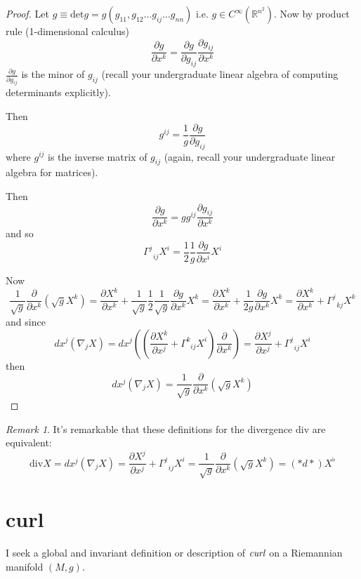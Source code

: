 \documentclass[twoside,landscape,10pt]{amsart}
\theoremstyle{plain}
\theoremstyle{definition}
\theoremstyle{remark}
\theoremstyle{remark}
\newtheorem{remark}{Remark}
\begin{document}
\begin{multicols*}{2}
\begin{proof}
Let $g\equiv \text{det}g = g(g_{11}, g_{12} \dots g_{ij} \dots g_{nn})$ i.e. $g\in C^{\infty}(\mathbb{R}^{n^2})$.  Now by product rule (1-dimensional calculus)
\[
\frac{ \partial g}{ \partial x^k} = \frac{ \partial g}{ \partial g_{ij} } \frac{ \partial g_{ij}}{ \partial x^k}
\]
$\frac{ \partial g}{ \partial g_{ij}}$ is the minor of $g_{ij}$ (recall your undergraduate linear algebra of computing determinants explicitly).  

Then
\[
g^{ij} = \frac{1}{g} \frac{ \partial g}{ \partial g_{ij}}
\]
where $g^{ij}$ is the inverse matrix of $g_{ij}$ (again, recall your undergraduate linear algebra for matrices).  

Then
\[
\frac{ \partial g}{ \partial x^k} = gg^{ij} \frac{ \partial g_{ij}}{ \partial x^k}
\]
and so 
\[
\Gamma^j_{ \; \; ij} X^i = \frac{1}{2} \frac{1}{g} \frac{ \partial g}{ \partial x^i} X^i
\]

Now 
\[
\frac{1}{\sqrt{g}} \frac{ \partial }{ \partial x^k} (\sqrt{g} X^k)  = \frac{ \partial X^k}{ \partial x^k} + \frac{1}{\sqrt{g}} \frac{1}{2} \frac{1}{\sqrt{g}} \frac{ \partial g}{ \partial x^k} X^k = \frac{ \partial X^k}{ \partial x^k} + \frac{1}{2g} \frac{ \partial g}{ \partial x^k} X^k = \frac{ \partial X^k}{ \partial x^k} + \Gamma^j_{ \; \; kj } X^k
\]
and since
\[
dx^j( \nabla_jX) = dx^j \left( \left( \frac{ \partial X^k}{ \partial x^j} + \Gamma^k_{ \; \; ij} X^i \right) \frac{ \partial }{ \partial x^k} \right) = \frac{ \partial X^j}{ \partial x^j} + \Gamma^j_{ \; \; ij} X^i 
\]
then
\[
dx^j(\nabla_jX) = \frac{1}{\sqrt{g}} \frac{ \partial }{ \partial x^k} (\sqrt{g} X^k)
\]

\end{proof}

\begin{remark}
It's remarkable that these definitions for the divergence $\text{div}$ are equivalent:
\begin{equation}
  \boxed{ 
    \text{div}X = dx^j\left( \nabla_j X \right) = \frac{ \partial X^j}{ \partial x^j} + \Gamma^j_{ \; \; ij} X^i = \frac{1}{\sqrt{g}} \frac{ \partial }{ \partial x^k} (\sqrt{g} X^k) = (*d*)X^{\flat}
    }
\end{equation}
\end{remark}

\section{curl}

I seek a global and invariant definition or description of $\emph{curl}$ on a Riemannian manifold $(M,g)$.  


\end{multicols*}
\end{document}
